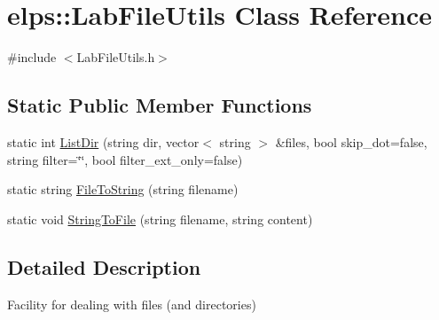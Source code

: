 \hypertarget{classelps_1_1_lab_file_utils}{\section{elps\+:\+:Lab\+File\+Utils Class Reference}
\label{classelps_1_1_lab_file_utils}
}


{\ttfamily \#include $<$Lab\+File\+Utils.\+h$>$}

\subsection*{Static Public Member Functions}
\begin{DoxyCompactItemize}
\item 
static int \hyperlink{classelps_1_1_lab_file_utils_aacfd6e526af7dc3622ffa8c1fd4073b1}{List\+Dir} (string dir, vector$<$ string $>$ \&files, bool skip\+\_\+dot=false, string filter=\char`\"{}\char`\"{}, bool filter\+\_\+ext\+\_\+only=false)
\item 
static string \hyperlink{classelps_1_1_lab_file_utils_a2ab6dd5307c6e6552e176a936d98d443}{File\+To\+String} (string filename)
\item 
static void \hyperlink{classelps_1_1_lab_file_utils_a5cd318782c1d5c32668b34d9034b0fde}{String\+To\+File} (string filename, string content)
\end{DoxyCompactItemize}


\subsection{Detailed Description}
Facility for dealing with files (and directories) 

